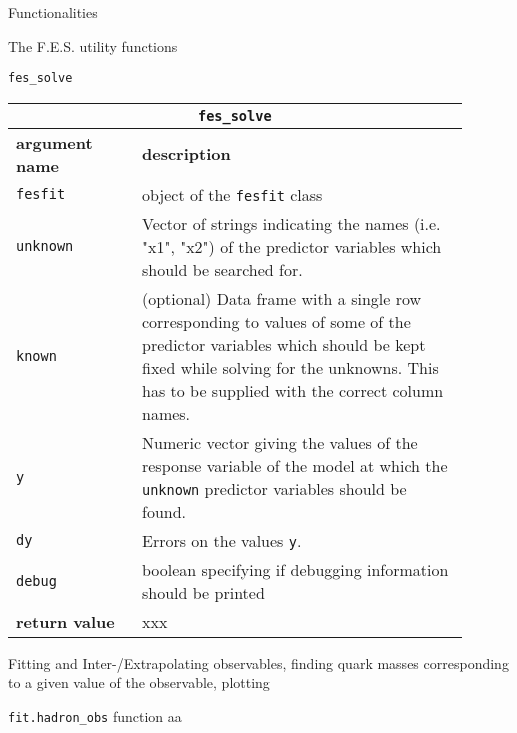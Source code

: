 \documentclass[10pt,a4paper]{article}
\begin{document}
\begin{section}{Functionalities}
\begin{subsection}{The F.E.S. utility functions}
\begin{subsubsection}{ {\tt fes\_solve} }
{ \centering
\begin{tabular}{|p{0.25\linewidth}|p{0.65\linewidth}|}
\hline
\multicolumn{2}{|c|}{ {\tt fes\_solve} } \\
\hline \hline \textbf{argument name} & \textbf{description} \\
\hline {\tt fesfit} & object of the {\tt fesfit} class \\ 
{\tt unknown} & Vector of strings indicating the names (i.e. "x1", "x2") of the predictor variables which should be searched for. \\ 
{\tt known} & (optional) Data frame with a single row corresponding to values of some of the predictor variables which should be kept fixed while solving for the unknowns. This has to be supplied with the correct column names. \\
{\tt y} & Numeric vector giving the values of the response variable of the model at which the {\tt unknown} predictor variables should be found. \\
{\tt dy} & Errors on the values {\tt y}. \\
{\tt debug} & boolean specifying if debugging information should be printed \\
\hline \hline
\textbf{return value} & xxx \\
\hline
\end{tabular}
} %

\end{subsubsection} %

\end{subsection} %


\begin{subsection}{Fitting and Inter-/Extrapolating observables, finding quark masses corresponding to a given value of the observable, plotting}

\begin{subsubsection}{{\tt fit.hadron\_obs} function}
aa
\end{subsubsection}

\end{subsection} %

\end{section} %
\end{document}
